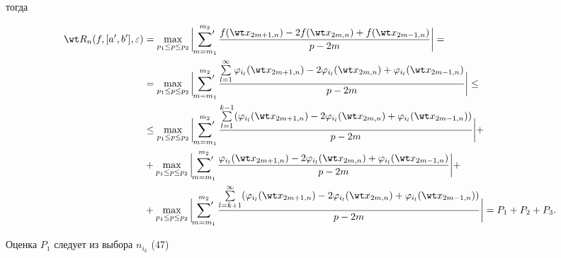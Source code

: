 \begin{pf}
тогда 


\begin{align} 


\wt R_n(f,[a',b'],\varepsilon)&=\max_{p_1\le p\le p_2} 


\bigg|\sideset{}{'}\sum^{m_2}_{m=m_1} 


\frac{f(\wt x_{2m+1,n})-2f(\wt x_{2m,n})+f(\wt x_{2m-1,n})} 


{p-2m}\bigg| =\notag \\ 


% 


&=\max_{p_1\le p\le p_2}\bigg|\sideset{}{'}\sum^{m_2}_{m=m_1} 


\frac{\sum\limits^\infty_{l=1} \varphi_{i_l}(\wt x_{2m+1,n})- 


2\varphi_{i_l}(\wt x_{2m,n})+\varphi_{i_l}(\wt x_{2m-1,n})} 


{p-2m}\bigg| \le\notag \\ 


% 


&\le\max_{p_1\le p\le p_2}\bigg|\sideset{}{'}\sum^{m_2}_{m=m_1} 


\frac{\sum\limits^{k-1}_{l=1}(\varphi_{i_l}(\wt x_{2m+1,n})- 


2\varphi_{i_l}(\wt x_{2m,n})+\varphi_{i_l}(\wt x_{2m-1,n}))} 


{p-2m}\bigg| +\notag \\ 


% 


&+\max_{p_1\le p\le p_2}\bigg|\sideset{}{'}\sum^{m_2}_{m=m_1} 


\frac{\varphi_{i_l}(\wt x_{2m+1,n})- 


2\varphi_{i_l}(\wt x_{2m,n})+\varphi_{i_l}(\wt x_{2m-1,n})} 


{p-2m}\bigg| +\notag \\ 


% 


&+\max_{p_1\le p\le p_2}\bigg|\sideset{}{'}\sum^{m_2}_{m=m_1} 


\frac{\sum\limits^\infty_{l=k+1}(\varphi_{i_l}(\wt x_{2m+1,n})- 


2\varphi_{i_l}(\wt x_{2m,n})+\varphi_{i_l}(\wt x_{2m-1,n}))} 


{p-2m}\bigg| =P_1+P_2+P_3. 


\end{align} 


Оценка $P_1$ следует из выбора $n_{i_k}$ (47) 


\begin{equation} 



\end{equation}
\end{pf}
